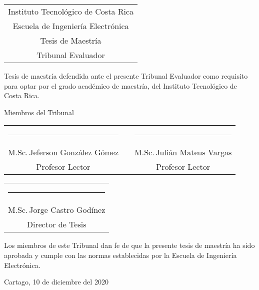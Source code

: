 
\thispagestyle{empty}

\newcommand{\lectorI}{M.Sc.\,Jeferson González Gómez}
\newcommand{\lectorII}{M.Sc.\,Julián Mateus Vargas}
\newcommand{\director}{M.Sc.\,Jorge Castro Godínez}


\begin{center}
  \begin{tabular}{c}
    Instituto Tecnológico de Costa Rica \\
    Escuela de Ingeniería Electrónica \\
    Tesis de Maestría \\
    Tribunal Evaluador
  \end{tabular}
\end{center}

\vfill

Tesis de maestría defendida ante el presente Tribunal Evaluador como
requisito para optar por el grado académico de maestría, del Instituto
Tecnológico de Costa Rica.

\vfill

\vspace*{20mm}
\begin{center}
 Miembros del Tribunal
\end{center}
\vspace*{8mm}

\vfill

\begin{center}
  \begin{tabular}{ccc}
    \rule{70mm}{0.5pt} & \rule{15mm}{0pt} & \rule{70mm}{0.5pt} \\
    \lectorI && \lectorII \\
    Profesor Lector && Profesor Lector
  \end{tabular}
  
  \vspace{10mm}

  \begin{tabular}{c}
    \rule{6cm}{0.5pt} \\
    \director \\
    Director de Tesis
  \end{tabular}
\end{center}

\vfill


Los miembros de este Tribunal dan fe de que la presente tesis de maestría 
ha sido aprobada y cumple con las normas establecidas por la Escuela de
Ingeniería Electrónica.

\vfill

\begin{center}
  Cartago, 10 de diciembre del 2020\par
\end{center}

\cleardoublepage


